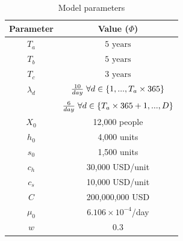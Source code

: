 \documentclass[12pt,a4paper]{article}
\begin{document}
\begin{table}
        \begin{center}
        \caption{Model parameters}
        \begin{tabular}{ |c|c| } 
         \hline
         \textbf{Parameter} & \textbf{Value ($\Phi$)}\\ 
         \hline
         $T_a$ & $5 \text{ years}$\\ 
         \hline
         $T_b$ & $5 \text{ years}$\\
         \hline
         $T_c$ & $3 \text{ years}$\\          
         \hline
         $\lambda_d$ & $\frac{10}{day} \hspace{0.1cm} \forall d \in \{1,...,T_a\times365\}$\\ 
          & $\frac{6}{day} \hspace{0.1cm} \forall d \in \{T_a\times365+1,...,D\}$\\          
         \hline           
         $X_0$ & 12,000 people\\         
         \hline
         $h_0$ & 4,000 units\\ 
         \hline
         $s_0$ & 1,500 units\\ 
         \hline      
         $c_h$ & 30,000 USD/unit\\ 
         \hline
         $c_s$ & 10,000 USD/unit\\ 
         \hline         
         $C$ & 200,000,000 USD\\ 
         \hline  
         $\mu_0$ & $6.106 \times 10^{-4}$/day \\ 
         \hline
         $w$ & $0.3$\\ 
         \hline
        \end{tabular}
        \label{tab:model_params}
        \end{center}
        \end{table}
\end{document}
